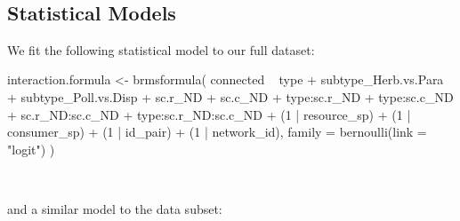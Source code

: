 \documentclass[11pt,]{article}
\newenvironment{Shaded}{}{}
\newcommand{\KeywordTok}[1]{\textcolor[rgb]{0.00,0.00,1.00}{#1}}
\newcommand{\DataTypeTok}[1]{#1}
\newcommand{\DecValTok}[1]{#1}
\newcommand{\StringTok}[1]{\textcolor[rgb]{0.00,0.50,0.50}{#1}}
\newcommand{\OperatorTok}[1]{#1}
\newcommand{\NormalTok}[1]{#1}
\begin{document}
~

\subsection{Statistical Models}\label{statistical-models}

We fit the following statistical model to our full dataset:

\begin{Shaded}
\begin{Highlighting}[]
\NormalTok{interaction.formula <-}\StringTok{ }\KeywordTok{brmsformula}\NormalTok{(}
\NormalTok{  connected }\OperatorTok{~}\StringTok{ }\NormalTok{type }\OperatorTok{+}\StringTok{ }\NormalTok{subtype_Herb.vs.Para }\OperatorTok{+}\StringTok{ }\NormalTok{subtype_Poll.vs.Disp }\OperatorTok{+}\StringTok{ }\NormalTok{sc.r_ND }\OperatorTok{+}\StringTok{ }\NormalTok{sc.c_ND }\OperatorTok{+}\StringTok{ }
\StringTok{    }\NormalTok{type}\OperatorTok{:}\NormalTok{sc.r_ND }\OperatorTok{+}\StringTok{ }\NormalTok{type}\OperatorTok{:}\NormalTok{sc.c_ND }\OperatorTok{+}\StringTok{ }\NormalTok{sc.r_ND}\OperatorTok{:}\NormalTok{sc.c_ND }\OperatorTok{+}
\StringTok{    }\NormalTok{type}\OperatorTok{:}\NormalTok{sc.r_ND}\OperatorTok{:}\NormalTok{sc.c_ND }\OperatorTok{+}
\StringTok{    }\NormalTok{(}\DecValTok{1} \OperatorTok{|}\StringTok{ }\NormalTok{resource_sp) }\OperatorTok{+}\StringTok{ }\NormalTok{(}\DecValTok{1} \OperatorTok{|}\StringTok{ }\NormalTok{consumer_sp) }\OperatorTok{+}\StringTok{ }\NormalTok{(}\DecValTok{1} \OperatorTok{|}\StringTok{ }\NormalTok{id_pair) }\OperatorTok{+}\StringTok{ }\NormalTok{(}\DecValTok{1} \OperatorTok{|}\StringTok{ }\NormalTok{network_id),}
  \DataTypeTok{family =} \KeywordTok{bernoulli}\NormalTok{(}\DataTypeTok{link =} \StringTok{"logit"}\NormalTok{)}
\NormalTok{)}
\end{Highlighting}
\end{Shaded}

~

and a similar model to the data subset:
\end{document}
